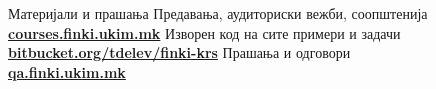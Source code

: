 \begin{frame}{Материјали и прашања}{}
    Предавања, аудиториски вежби, соопштенија\\
    \href{http://courses.finki.ukim.mk/}{\textbf{courses.finki.ukim.mk}}
    \vfill
    Изворен код на сите примери и задачи\\
    \href{http://bitbucket.org/tdelev/finki-krs/}{\textbf{bitbucket.org/tdelev/finki-krs}}
    \vfill
    Прашања и одговори\\
    \href{http://qa.finki.ukim.mk}{\textbf{qa.finki.ukim.mk}}
\end{frame}
